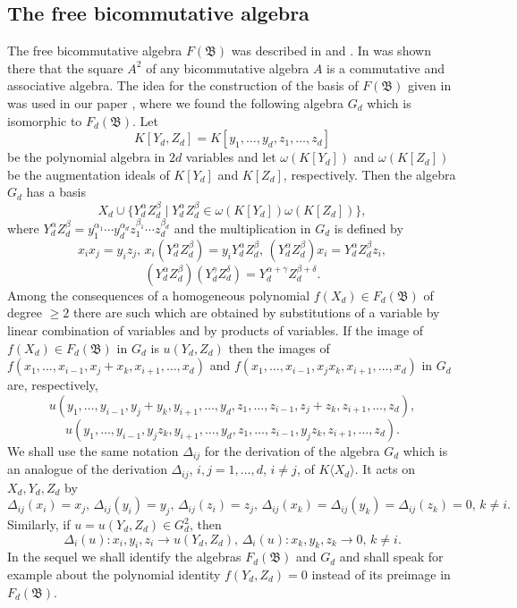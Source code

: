 \documentclass{amsart}
\theoremstyle{definition}
\begin{document}
\subsection{The free bicommutative algebra}
The free bicommutative algebra $F({\mathfrak B})$ was described in \cite{DT} and \cite{DIT}.
In was shown there that the square $A^2$ of any bicommutative algebra $A$ is a commutative and associative algebra.
The idea for the construction of the basis of $F({\mathfrak B})$ given in \cite{DIT} was used in our paper \cite{DrZ},
where we found the following algebra $G_d$ which is isomorphic to $F_d({\mathfrak B})$.
Let
\[
K[Y_d,Z_d]=K[y_1,\ldots,y_d,z_1,\ldots,z_d]
\]
be the polynomial algebra in $2d$ variables
and let $\omega(K[Y_d])$ and $\omega(K[Z_d])$ be the augmentation ideals of $K[Y_d]$ and $K[Z_d]$, respectively.
Then the algebra $G_d$ has a basis
\[
X_d\cup \{Y_d^{\alpha}Z_d^{\beta}\mid Y_d^{\alpha}Z_d^{\beta}\in \omega(K[Y_d])\omega(K[Z_d])\},
\]
where $Y_d^{\alpha}Z_d^{\beta}=y_1^{\alpha_1}\cdots y_d^{\alpha_d}z_1^{\beta_1}\cdots z_d^{\beta_d}$
and the multiplication in $G_d$ is defined by
\[
x_ix_j=y_iz_j,\,x_i(Y_d^{\alpha}Z_d^{\beta})=y_iY_d^{\alpha}Z_d^{\beta},\,(Y_d^{\alpha}Z_d^{\beta})x_i=Y_d^{\alpha}Z_d^{\beta}z_i,
\]
\[
(Y_d^{\alpha}Z_d^{\beta})(Y_d^{\gamma}Z_d^{\delta})=Y_d^{\alpha+\gamma}Z_d^{\beta+\delta}.
\]
Among the consequences of a homogeneous polynomial $f(X_d)\in F_d({\mathfrak B})$ of degree $\geq 2$
there are such which are obtained by substitutions of a variable by linear combination of variables
 and by products of variables. If the image of $f(X_d)\in F_d({\mathfrak B})$ in $G_d$ is $u(Y_d,Z_d)$
 then the images of $f(x_1,\ldots,x_{i-1},x_j+x_k,x_{i+1},\ldots,x_d)$ and $f(x_1,\ldots,x_{i-1},x_jx_k,x_{i+1},\ldots,x_d)$
 in $G_d$ are, respectively,
 \[
 u(y_1,\ldots,y_{i-1},y_j+y_k,y_{i+1},\ldots,y_d,z_1,\ldots,z_{i-1},z_j+z_k,z_{i+1},\ldots,z_d),
 \]
 \[
 u(y_1,\ldots,y_{i-1},y_jz_k,y_{i+1},\ldots,y_d,z_1,\ldots,z_{i-1},y_jz_k,z_{i+1},\ldots,z_d).
 \]
We shall use the same notation $\Delta_{ij}$ for the derivation of the algebra $G_d$
which is an analogue of the derivation $\Delta_{ij}$, $i,j=1,\ldots,d$, $i\not=j$, of $K\langle X_d\rangle$. It acts on $X_d,Y_d,Z_d$ by
\[
\Delta_{ij}(x_i)=x_j,\,\Delta_{ij}(y_i)=y_j,\,\Delta_{ij}(z_i)=z_j,\,\Delta_{ij}(x_k)=\Delta_{ij}(y_k)=\Delta_{ij}(z_k)=0,\,k\not=i.
\]
Similarly, if $u=u(Y_d,Z_d)\in G_d^2$, then
\[
\Delta_i(u):x_i,y_i,z_i\to u(Y_d,Z_d),\,\Delta_i(u):x_k,y_k,z_k\to 0,\,k\not=i.
\]
In the sequel we shall identify the algebras $F_d({\mathfrak B})$ and $G_d$ and shall speak for example about the polynomial identity
$f(Y_d,Z_d)=0$ instead of its preimage in $F_d({\mathfrak B})$.
\end{document}
